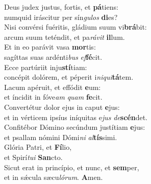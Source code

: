 \evenverse Deus judex justus, fortis, et \textbf{pá}tiens:~\*\\
\evenverse numquid iráscitur per sín\textit{gu}\textit{los} \textbf{di}es?\\
\oddverse Nisi convérsi fuéritis, gládium suum vi\textbf{brá}bit:~\*\\
\oddverse arcum suum teténdit, et pa\textit{rá}\textit{vit} \textbf{il}lum.\\
\evenverse Et in eo parávit vasa \textbf{mor}tis:~\*\\
\evenverse sagíttas suas ardénti\textit{bus} \textit{ef}\textbf{fé}cit.\\
\oddverse Ecce partúriit inju\textbf{stí}tiam:~\*\\
\oddverse concépit dolórem, et péperit i\textit{ni}\textit{qui}\textbf{tá}tem.\\
\evenverse Lacum apéruit, et effódit \textbf{e}um:~\*\\
\evenverse et íncidit in fóve\textit{am} \textit{quam} \textbf{fe}cit.\\
\oddverse Convertétur dolor ejus in caput \textbf{e}jus:~\*\\
\oddverse et in vérticem ipsíus iníquitas e\textit{jus} \textit{de}\textbf{scén}det.\\
\evenverse Confitébor Dómino secúndum justítiam \textbf{e}jus:~\*\\
\evenverse et psallam nómini Dómi\textit{ni} \textit{al}\textbf{tís}simi.\\
\oddverse Glória Patri, et \textbf{Fí}lio,~\*\\
\oddverse et Spirí\textit{tu}\textit{i} \textbf{San}cto.\\
\evenverse Sicut erat in princípio, et nunc, et \textbf{sem}per,~\*\\
\evenverse et in sǽcula sæcu\textit{ló}\textit{rum}. \textbf{A}men.\\
